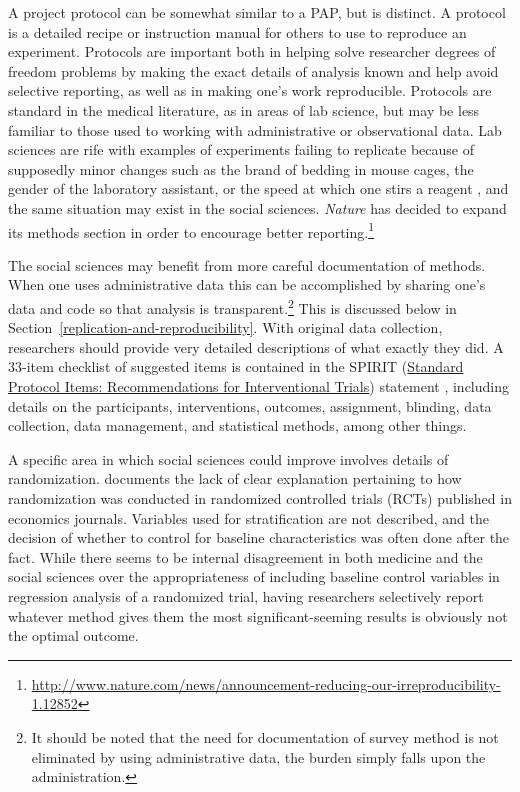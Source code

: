\documentclass[12pt] {article}
\begin{document}
A project protocol can be somewhat similar to a PAP, but is distinct. A protocol is a detailed recipe or instruction manual for others to use to reproduce an experiment. Protocols are important both in helping solve researcher degrees of freedom problems by making the exact details of analysis known and help avoid selective reporting, as well as in making one's work reproducible. Protocols are standard in the medical literature, as in areas of lab science, but may be less familiar to those used to working with administrative or observational data. Lab sciences are rife with examples of experiments failing to replicate because of supposedly minor changes such as the brand of bedding in mouse cages, the gender of the laboratory assistant, or the speed at which one stirs a reagent \citep{sorge2014olfactory, hines2014sorting}, and the same situation may exist in the social sciences. \textit{Nature} has decided to expand its methods section in order to encourage better reporting.\footnote{\url{http://www.nature.com/news/announcement-reducing-our-irreproducibility-1.12852}}

The social sciences may benefit from more careful documentation of methods. When one uses administrative data this can be accomplished by sharing one's data and code so that analysis is transparent.\footnote{It should be noted that the need for documentation of survey method is not eliminated by using administrative data, the burden simply falls upon the administration.} This is discussed below in Section~\ref{replication-and-reproducibility}. With original data collection, researchers should provide very detailed descriptions of what exactly they did. A 33-item checklist of suggested items is contained in the SPIRIT (\href{http://www.spirit-statement.org}{Standard Protocol Items: Recommendations for Interventional
Trials}) statement \citep{chan_spirit_2013}, including details on the participants, interventions, outcomes, assignment, blinding, data collection, data management, and statistical methods, among other things. 

A specific area in which social sciences could improve involves details of randomization. \cite{bruhn_pursuit_2009} documents the lack of clear explanation pertaining to how randomization was conducted in randomized controlled trials (RCTs) published in economics journals. Variables used for stratification are not described, and the decision of whether to control for baseline characteristics was often done after the fact. While there seems to be internal disagreement in both
medicine and the social sciences over the appropriateness of including baseline
control variables in regression analysis of a randomized trial, having
researchers selectively report whatever method gives them the most
significant-seeming results is obviously not the optimal outcome. 
\end{document}
